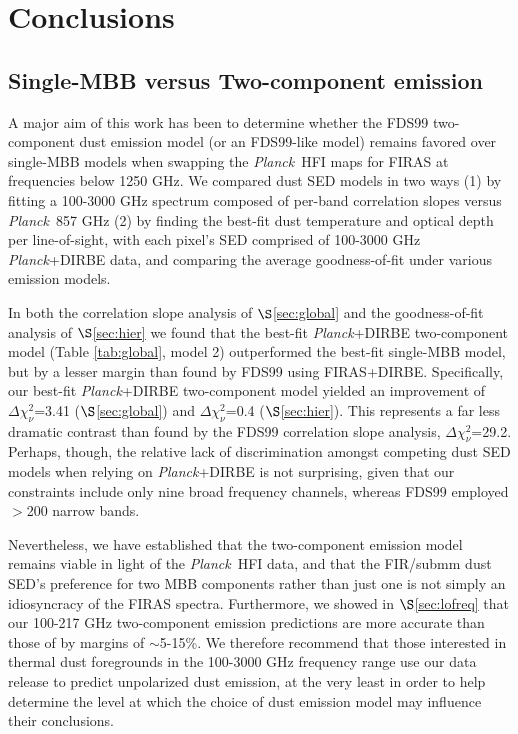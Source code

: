 \documentclass{emulateapj}
\newcommand{\PLANCK}{{\it Planck}}
\begin{document}
\section{Conclusions}
\label{sec:conclusion}

\subsection{Single-MBB versus Two-component emission}
A major aim of this work has been to determine whether the  FDS99 
two-component dust emission model (or an FDS99-like model) remains favored over
single-MBB models when swapping the \PLANCK~HFI maps for FIRAS at frequencies 
below 1250 GHz. We compared dust SED models in two ways (1) by fitting a 
100-3000 GHz spectrum composed of per-band correlation slopes versus 
\PLANCK~857 GHz (2) by finding the best-fit dust temperature and optical depth
per line-of-sight, with each pixel's SED comprised of 100-3000 GHz 
\PLANCK+DIRBE data, and comparing the average goodness-of-fit under various
emission models.

In both the correlation slope analysis of $\S$\ref{sec:global} and the 
goodness-of-fit analysis of $\S$\ref{sec:hier} we found that the 
best-fit \PLANCK+DIRBE two-component model (Table \ref{tab:global}, model 2) 
outperformed the best-fit single-MBB model, but by a lesser margin than found 
by FDS99 using FIRAS+DIRBE. Specifically, our best-fit \PLANCK+DIRBE 
two-component model yielded an improvement of $\Delta \chi^2_{\nu}$=3.41 
($\S$\ref{sec:global}) and $\Delta \chi^2_{\nu}$=0.4 ($\S$\ref{sec:hier}). This
represents a far less dramatic contrast than found by the FDS99 correlation 
slope analysis, $\Delta \chi^2_{\nu}$=29.2. Perhaps, though, the relative lack 
of discrimination amongst competing dust SED models when relying on 
\PLANCK+DIRBE is not surprising, given that our constraints include only nine 
broad frequency channels, whereas FDS99 employed $>$200 narrow bands.


Nevertheless, we have established that the two-component emission model
remains viable in light of the \PLANCK~HFI data, and that the FIR/submm 
dust SED's preference for two MBB components rather than just one is not
simply an idiosyncracy of the FIRAS spectra. Furthermore, we showed in 
$\S$\ref{sec:lofreq} that our 100-217 GHz two-component emission predictions
are more accurate than those of \cite{planckdust} by margins of $\sim$5-15\%.
We therefore recommend that those interested in thermal dust foregrounds in 
the 100-3000 GHz frequency range use our data release to predict unpolarized 
dust emission, at the very least in order to help determine the level at which 
the choice of dust emission model may influence their conclusions.
\end{document}

